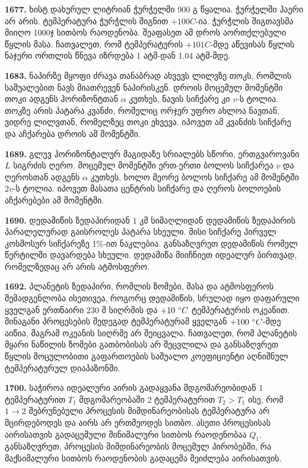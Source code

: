 \documentclass[12pt,a4paper,]{report}
\begin{document}
\textbf{1677.} ხისტ დახურულ ლიტრიან ჭურჭელში 900 გ წყალია. ჭურჭელში ჰაერი არ არის. ტემპერატურა ჭურჭლის შიგნით $+100 C$-ია. ჭურჭლის შიგთავსმა მიიღო 1000ჯ სითბოს რაოდენობა. შეაფასეთ ამ დროს აორთქლებული წყლის მასა. ჩათვალეთ, რომ ტემპერატურის $+101 C$-მდე აწევისას წყლის ნაჯერი ორთლის წნევა იზრდება 1 ატმ-დან 1.04 ატმ-მდე.

\textbf{1683.} ნაპირზე მყოფი ძრავა თანაბრად ახვევს ლილვზე თოკს, რომლის საშუალებით ნავს მიათრევენ ნაპირისკენ. დროის მოცემულ მომენტში თოკი ადგენს ჰორიზონტთან $\alpha$ კუთხეს, ნავის სიჩქარე კი $v$-ს ტოლია. თოკზე არის პატარა კვანძი, რომელიც ორჯერ უფრო ახლოა ნავთან, ვიდრე ლილვთან, რომელზეც თოკი ეხვევა. იპოვეთ ამ კვანძის სიჩქარე და აჩქარება დროის ამ მომენტში. 

\textbf{1689.} გლუვ ჰორიზონტალურ მაგიდაზე სრიალებს სწორი, ერთგვაროვანი $L$ სიგრძის ღერო. მოცემულ მომენტში ერთ-ერთი ბოლოს სიჩქარეა $v$ და ღეროსთან ადგენს $\alpha$ კუთხეს, ხოლო მეორე ბოლოს სიჩქარე ამ მომენტში $2v$-ს ტოლია. იპოვეთ მასათა ცენტრის სიჩქარე და ღეროს ბოლოების აჩქარებები ამ მომენტში. 

\textbf{1690.} დედამიწის ზედაპირიდან 1 კმ სიმაღლიდან დედამიწის ზედაპირის პარალელურად გაისროლეს პატარა სხეული. მისი სიჩქარე პირველ კოსმოსურ სიჩქარეზე 1$\%$-ით ნაკლებია. განსაზღვრეთ დედამიწის რომელ წერტილში დავარდება სხეული. დედამიწა მიიჩნიეთ იდეალურ ბირთვად, რომელზედაც არ არის ატმოსფერო. 

\textbf{1692.} პლანეტის ზედაპირი, რომლის ზომები, მასა და ატმოსფეროს შემადგენლობა ისეთივეა, როგორც დედამიწის, სრულად იყო დაფარული ყველგან ერთნაირი 230 მ სიღრმის და $+10\ \degree C$ ტემპერატურის ოკეანით. შინაგანი პროცესების შედეგად ტემპერატურამ ყველგან $+100\ \degree C$-მდე აიწია, მაგრამ ოკეანის სიღრმე არ შეიცვალა. ჩათვალეთ, რომ პლანეტის მყარი ნაწილის ზომები გათბობისას არ შეცვლილა და განსაზღვრეთ წყლის მოცულობითი გაფართოების საშუალო კოეფიციენტი აღნიშნულ ტემპერატურულ დიაპაზონში.

\textbf{1700.} საჭიროა იდეალური აირის გადაყვანა მდგომარეობიდან 1 ტემპერატურით $T_1$ მდგომარეობაში 2 ტემპერატურით $T_2>T_1$ ისე, რომ $1\rightarrow 2$ შებრუნებული პროცესის მიმდინარეობისას ტემპერატურა არ მცირდებოდეს და აირს არ ერთმეოდეს სითბო. ასეთი პროცესისას აირისათვის გადაცემული მინიმალური სითბოს რაოდენობაა $Q_1$. განსაზღვრეთ, პროცესის მიმდინარეობის მოცემულ პირობებში, რა მაქსიმალური სითბოს რაოდენობის გადაცემა შეიძლება აირისათვის.
\end{document}

